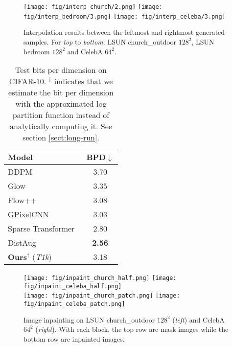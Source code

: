 \documentclass{article} \usepackage{iclr2021_conference,times}
\begin{document}
\begin{figure}[ht]
\begin{center}
\texttt{[image: fig/interp\_church/2.png]} 
\texttt{[image: fig/interp\_bedroom/3.png]}
\texttt{[image: fig/interp\_celeba/3.png]}
\end{center}
\caption{Interpolation results between the leftmost and rightmost generated samples. For {\em top} to {\em bottom}: LSUN church\_outdoor $128^2$, LSUN bedroom $128^2$ and CelebA $64^2$. } 
\label{fig: interp}
\end{figure}
\begin{center}
	\begin{minipage}[c]{.46\textwidth}
		\begin{table}[H]
\centering
	\caption{Test bits per dimension on CIFAR-10. $^\dagger$ indicates that we estimate the bit per dimension with the approximated log partition function instead of analytically computing it. See section \ref{sect:long-run}. } 
\footnotesize
	 \setlength\tabcolsep{2.5pt}
 \begin{tabular}{lc} 
    \toprule
    Model & BPD$\downarrow$ \\
    \midrule
    DDPM~\citep{ho2020denoising} & 3.70 \\
    Glow~\citep{kingma2018glow} & 3.35 \\
    Flow++~\citep{ho2019flow++} & 3.08 \\
    GPixelCNN~\citep{van2016conditional} & 3.03 \\
    Sparse Transformer~\citep{child2019generating} & 2.80 \\
    DistAug~\citep{icml2020_6095} & {\bf 2.56} \\
    {\bf Ours}$^\dagger$ ({\em T1k}) & 3.18 \\
        \bottomrule 
    \end{tabular}
    \label{tabl: bpd}
\end{table}
	\end{minipage}
	\begin{minipage}[c]{.53\textwidth}
\begin{figure}[H]
\begin{center}
\texttt{[image: fig/inpaint\_church\_half.png]} 
\texttt{[image: fig/inpaint\_celeba\_half.png]}\\
\vspace{1mm}
\texttt{[image: fig/inpaint\_church\_patch.png]} 
\texttt{[image: fig/inpaint\_celeba\_patch.png]}\\
\end{center}
\caption{Image inpainting on LSUN church\_outdoor $128^2$ ({\em left}) and CelebA $64^2$ ({\em right}). With each block, the top row are mask images while the bottom row are inpainted images.} 
\label{fig: inpaint}
\end{figure} 
	\end{minipage}
\end{center}
\end{document}
